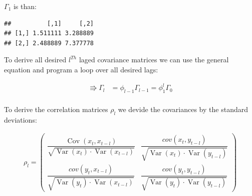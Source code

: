 \documentclass[12pt,a4paper]{article}
\newcommand{\Var}{\operatorname{Var}}
\newcommand{\Cov}{\operatorname{Cov}}
\newenvironment{Shaded}{\begin{snugshade}}{\end{snugshade}}
\newcommand{\CommentTok}[1]{\textcolor[rgb]{0.56,0.35,0.01}{\textit{#1}}}
\newcommand{\ControlFlowTok}[1]{\textcolor[rgb]{0.13,0.29,0.53}{\textbf{#1}}}
\newcommand{\DecValTok}[1]{\textcolor[rgb]{0.00,0.00,0.81}{#1}}
\newcommand{\KeywordTok}[1]{\textcolor[rgb]{0.13,0.29,0.53}{\textbf{#1}}}
\newcommand{\NormalTok}[1]{#1}
\newcommand{\OperatorTok}[1]{\textcolor[rgb]{0.81,0.36,0.00}{\textbf{#1}}}
\newcommand{\StringTok}[1]{\textcolor[rgb]{0.31,0.60,0.02}{#1}}
\begin{document}
\begin{Shaded}
\end{Shaded}

\(\Gamma_1\) is than:

\begin{verbatim}
##          [,1]     [,2]
## [1,] 1.511111 3.288889
## [2,] 2.488889 7.377778
\end{verbatim}

To derive all desired \(l^{Th}\) laged covariance matrices we can use
the general equation and program a loop over all desired lags:

\begin{align*}
  \Rrightarrow \Gamma_l & = \phi_{l-1} \Gamma_{l-1} = \phi_1^{l} \Gamma_0\\
\end{align*}

To derive the correlation matrices \(\rho_l\) we devide the covariances
by the standard deviations:

\begin{align*}
  \rho_l = 
  \begin{pmatrix}
    \dfrac{\Cov(x_t , x_{t-l})}{\sqrt{\Var(x_t) \cdot \Var(x_{t- l})}} &
    \dfrac{cov(x_t , y_{t-l})}{\sqrt{\Var(x_t) \cdot \Var(y_{t- l})}}\\
    \dfrac{cov(y_t , x_{t-l})}{\sqrt{\Var(y_t) \cdot \Var(x_{t- l})}} &
    \dfrac{cov(y_t , y_{t-l})}{\sqrt{\Var(y_t) \cdot \Var(y_{t- l})}}
  \end{pmatrix}\\
\end{align*}

\begin{Shaded}
\end{Shaded}
\end{document}

